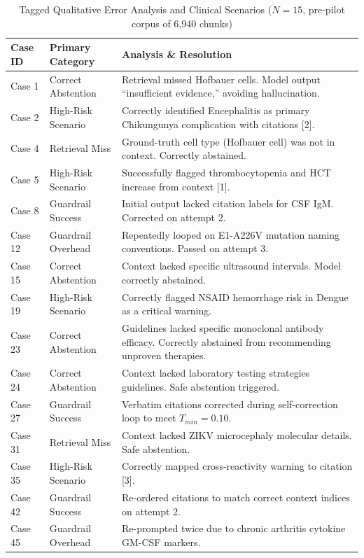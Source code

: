 \begin{table}[htbp]
\centering
\caption{Tagged Qualitative Error Analysis and Clinical Scenarios ($N=15$, pre-pilot corpus of 6,940 chunks)}
\label{tab:qualitative}
\small
\begin{tabular}{llp{9.5cm}}
\toprule
Case ID & Primary Category & Analysis \& Resolution \\
\midrule
Case 1 & Correct Abstention & Retrieval missed Hofbauer cells. Model output ``insufficient evidence,'' avoiding hallucination. \\
Case 2 & High-Risk Scenario & Correctly identified Encephalitis as primary Chikungunya complication with citations [2]. \\
Case 4 & Retrieval Miss & Ground-truth cell type (Hofbauer cell) was not in context. Correctly abstained. \\
Case 5 & High-Risk Scenario & Successfully flagged thrombocytopenia and HCT increase from context [1]. \\
Case 8 & Guardrail Success & Initial output lacked citation labels for CSF IgM. Corrected on attempt 2. \\
Case 12 & Guardrail Overhead & Repeatedly looped on E1-A226V mutation naming conventions. Passed on attempt 3. \\
Case 15 & Correct Abstention & Context lacked specific ultrasound intervals. Model correctly abstained. \\
Case 19 & High-Risk Scenario & Correctly flagged NSAID hemorrhage risk in Dengue as a critical warning. \\
Case 23 & Correct Abstention & Guidelines lacked specific monoclonal antibody efficacy. Correctly abstained from recommending unproven therapies. \\
Case 24 & Correct Abstention & Context lacked laboratory testing strategies guidelines. Safe abstention triggered. \\
Case 27 & Guardrail Success & Verbatim citations corrected during self-correction loop to meet $T_{min}=0.10$. \\
Case 31 & Retrieval Miss & Context lacked ZIKV microcephaly molecular details. Safe abstention. \\
Case 35 & High-Risk Scenario & Correctly mapped cross-reactivity warning to citation [3]. \\
Case 42 & Guardrail Success & Re-ordered citations to match correct context indices on attempt 2. \\
Case 45 & Guardrail Overhead & Re-prompted twice due to chronic arthritis cytokine GM-CSF markers. \\
\bottomrule
\end{tabular}
\end{table}
